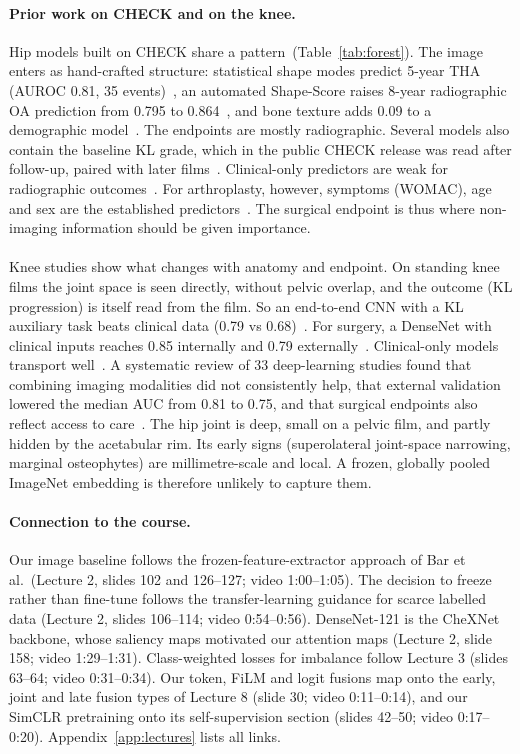\paragraph{Prior work on CHECK and on the knee.}
Hip models built on CHECK share a pattern~(Table~\ref{tab:forest}). The image enters as hand-crafted structure:
statistical shape modes predict 5-year THA (AUROC 0.81, 35 events)~\cite{agricola2013}, an automated Shape-Score raises
8-year radiographic OA prediction from 0.795 to 0.864~\cite{gielis2020}, and bone texture adds 0.09 to a demographic
model~\cite{hirvasniemi2019}. The endpoints are mostly radiographic. Several models also contain the baseline KL grade,
which in the public CHECK release was read after follow-up, paired with later films~\cite{macri2022}. Clinical-only
predictors are weak for radiographic outcomes~\cite{saberihosnijeh2018,vanberkel2021}. For arthroplasty, however,
symptoms (WOMAC), age and sex are the established predictors~\cite{zarringam2020}. The surgical endpoint is thus where
non-imaging information should be given importance.

\paragraph{}
Knee studies show what changes with anatomy and endpoint. On standing knee films the joint space is seen directly,
without pelvic overlap, and the outcome (KL progression) is itself read from the film. So an end-to-end CNN with a KL
auxiliary task beats clinical data (0.79 vs 0.68)~\cite{tiulpin2019}. For surgery, a DenseNet with clinical inputs
reaches 0.85 internally and 0.79 externally~\cite{musbahi2026}. Clinical-only models transport well~\cite{castagno2025}.
A systematic review of 33 deep-learning studies found that combining imaging modalities did not consistently help, that
external validation lowered the median AUC from 0.81 to 0.75, and that surgical endpoints also reflect access to
care~\cite{gillani2026}. The hip joint is deep,
small on a pelvic film, and partly hidden by the acetabular rim. Its early signs (superolateral joint-space narrowing,
marginal osteophytes) are millimetre-scale and local. A frozen, globally pooled ImageNet embedding is therefore unlikely
to capture them.

\paragraph{Connection to the course.}
Our image baseline follows the frozen-feature-extractor approach of Bar et al.\ (Lecture 2, slides 102 and 126--127;
video 1:00--1:05). The decision to freeze rather than fine-tune follows the transfer-learning guidance for scarce
labelled data (Lecture 2, slides 106--114; video 0:54--0:56). DenseNet-121 is the CheXNet backbone, whose saliency maps
motivated our attention maps (Lecture 2, slide 158; video 1:29--1:31). Class-weighted losses for imbalance follow
Lecture 3 (slides 63--64; video 0:31--0:34). Our token, FiLM and logit fusions map onto the early, joint and late fusion
types of Lecture 8 (slide 30; video 0:11--0:14), and our SimCLR pretraining onto its self-supervision section (slides
42--50; video 0:17--0:20). Appendix~\ref{app:lectures} lists all links.

